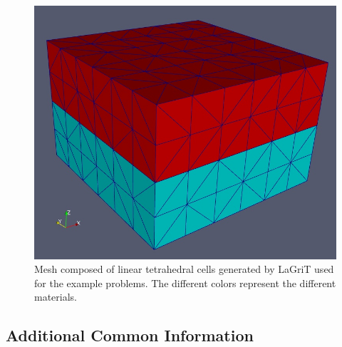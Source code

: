 \begin{figure}
  \includegraphics[scale=0.45]{examples/figs/3dtet4_mesh}
  \caption{Mesh composed of linear tetrahedral cells generated by
    LaGriT used for the example problems. The different colors
    represent the different materials.}
  \label{fig:3dtet4:mesh}
\end{figure}


\subsection{Additional Common Information}


